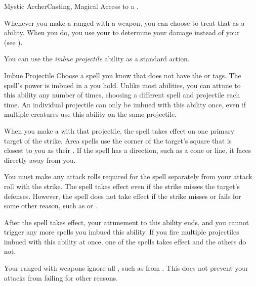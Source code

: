     \begin{magicalfeat}{Mystic Archer}{Casting, Magical}
        \featpre Access to a .

         Whenever you make a ranged  with a  weapon, you can choose to treat that as a \magical ability.
        When you do, you use your  to determine your damage instead of your  (see ).

         You can use the \textit{imbue projectile} ability as a standard action.
        \begin{magicalattuneability}{Imbue Projectile}{}
            \rankline
            Choose a spell you know that does not have the  or  tags.
            The spell's power is imbued in a  you hold.
            Unlike most  abilities, you can attune to this ability any number of times, choosing a different spell and projectile each time.
            An individual projectile can only be imbued with this ability once, even if multiple creatures use this ability on the same projectile.

            When you make a  with that projectile, the spell takes effect on one primary target of the strike.
            Area spells use the corner of the target's square that is closest to you as their .
            If the spell has a direction, such as a cone or line, it faces directly away from you.

            You must make any attack rolls required for the spell separately from your attack roll with the strike.
            The spell takes effect even if the strike misses the target's defenses.
            However, the spell does not take effect if the strike misses or fails for some other reason, such as  or .

            After the spell takes effect, your attunement to this ability ends, and you  cannot trigger any more spells you imbued this ability.
            If you fire multiple projectiles imbued with this ability at once, one of the spells takes effect and the others do not.
        \end{magicalattuneability}

         Your ranged  with  weapons ignore all , such as from .
        This does not prevent your attacks from failing for other reasons.


\end{magicalfeat}

